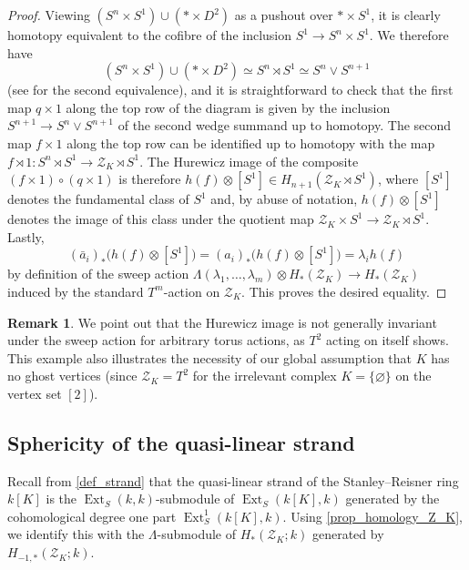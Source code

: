 \documentclass[a4paper,10pt]{amsart}
\theoremstyle{definition}
\newtheorem{remark}[theorem]{Remark}
\theoremstyle{remark}
\DeclareMathOperator{\Ext}{Ext}
\begin{document}
\begin{proof}
Viewing $(S^n\times S^1)\cup(*\times D^2)$ as a pushout over $*\times S^1$, it is clearly homotopy equivalent to the cofibre of the inclusion $S^1 \to S^n\times S^1$. We therefore have
\[
(S^n\times S^1)\cup(*\times D^2) \simeq S^n \rtimes S^1 \simeq S^n\vee S^{n+1}
\]
(see \cite[Proposition~7.7.8]{S} for the second equivalence), and it is straightforward to check that the first map $q\times 1$ along the top row of the diagram is given by the inclusion $S^{n+1} \to S^n\vee S^{n+1}$ of the second wedge summand up to homotopy. The second map $f\times 1$ along the top row can be identified up to homotopy with the map $f\rtimes 1\colon S^n\rtimes S^1 \to \mathcal{Z}_K\rtimes S^1$. The Hurewicz image of the composite $(f\times 1)\circ(q\times 1)$ is therefore $h(f)\otimes [S^1] \in H_{n+1}(\mathcal{Z}_K\rtimes S^1)$, where $[S^1]$ denotes the fundamental class of $S^1$ and, by abuse of notation, $h(f)\otimes [S^1]$ denotes the image of this class under the quotient map $\mathcal{Z}_K\times S^1 \to \mathcal{Z}_K\rtimes S^1$. Lastly, 
\[
(\bar{a}_i)_*\big(h(f)\otimes [S^1]\big)=(a_i)_*\big(h(f)\otimes [S^1]\big)=\lambda_ih(f)
\] 
by definition of the sweep action $\Lambda(\lambda_1,\ldots,\lambda_m) \otimes H_*(\mathcal{Z}_K) \to H_*(\mathcal{Z}_K)$ induced by the standard $T^m$-action on $\mathcal{Z}_K$. This proves the desired equality.
\end{proof}

\begin{remark}
We point out that the Hurewicz image is not generally invariant under the sweep action for arbitrary torus actions, as $T^2$ acting on itself shows. This example also illustrates the necessity of our global assumption that $K$ has no ghost vertices (since $\mathcal{Z}_K=T^2$ for the irrelevant complex $K=\{\varnothing\}$ on the vertex set $[2]$).
\end{remark}



\subsection*{Sphericity of the quasi-linear strand} 

Recall from \cref{def_strand} that the quasi-linear strand of the Stanley--Reisner ring $k[K]$ is the $\Ext_S(k,k)$-submodule of $\Ext_S(k[K],k)$ generated by the cohomological degree one part $\Ext_S^1(k[K],k)$. Using \cref{prop_homology_Z_K}, we identify this with the $\Lambda$-submodule of $H_*(\mathcal{Z}_K;k)$ generated by $H_{-1,*}(\mathcal{Z}_K;k)$. 
\end{document}
